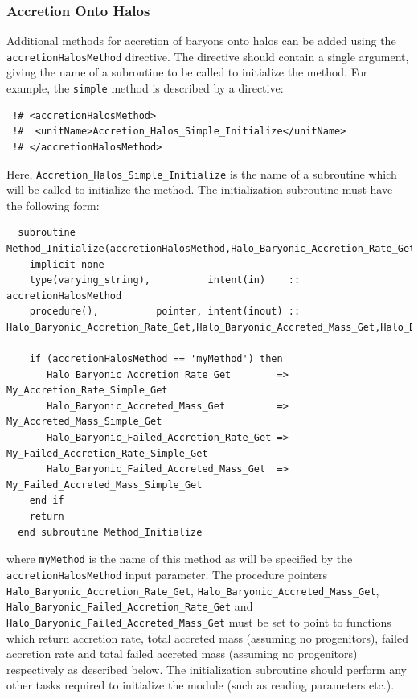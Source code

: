 \subsubsection{Accretion Onto Halos}

Additional methods for accretion of baryons onto halos can be added using the {\tt accretionHalosMethod} directive. The directive should contain a single argument, giving the name of a subroutine to be called to initialize the method. For example, the {\tt simple} method is described by a directive:
\begin{verbatim}
 !# <accretionHalosMethod>
 !#  <unitName>Accretion_Halos_Simple_Initialize</unitName>
 !# </accretionHalosMethod>
\end{verbatim}
Here, {\tt Accretion\_Halos\_Simple\_Initialize} is the name of a subroutine which will be called to initialize the method. The initialization subroutine must have the following form:
\begin{verbatim}
  subroutine Method_Initialize(accretionHalosMethod,Halo_Baryonic_Accretion_Rate_Get,Halo_Baryonic_Accreted_Mass_Get,Halo_Baryonic_Failed_Accretion_Rate_Get,Halo_Baryonic_Failed_Accreted_Mass_Get)
    implicit none
    type(varying_string),          intent(in)    :: accretionHalosMethod
    procedure(),          pointer, intent(inout) :: Halo_Baryonic_Accretion_Rate_Get,Halo_Baryonic_Accreted_Mass_Get,Halo_Baryonic_Failed_Accretion_Rate_Get,Halo_Baryonic_Failed_Accreted_Mass_Get
    
    if (accretionHalosMethod == 'myMethod') then
       Halo_Baryonic_Accretion_Rate_Get        => My_Accretion_Rate_Simple_Get
       Halo_Baryonic_Accreted_Mass_Get         => My_Accreted_Mass_Simple_Get
       Halo_Baryonic_Failed_Accretion_Rate_Get => My_Failed_Accretion_Rate_Simple_Get
       Halo_Baryonic_Failed_Accreted_Mass_Get  => My_Failed_Accreted_Mass_Simple_Get
    end if
    return
  end subroutine Method_Initialize
\end{verbatim}
where {\tt myMethod} is the name of this method as will be specified by the {\tt accretionHalosMethod} input parameter. The procedure pointers {\tt Halo\_Baryonic\_Accretion\_Rate\_Get}, {\tt Halo\_Baryonic\_Accreted\_Mass\_Get}, {\tt Halo\_Baryonic\_Failed\_Accretion\_Rate\_Get} and {\tt Halo\_Baryonic\_Failed\_Accreted\_Mass\_Get} must be set to point to functions which return accretion rate, total accreted mass (assuming no progenitors), failed accretion rate and total failed accreted mass (assuming no progenitors) respectively as described below. The initialization subroutine should perform any other tasks required to initialize the module (such as reading parameters etc.).

